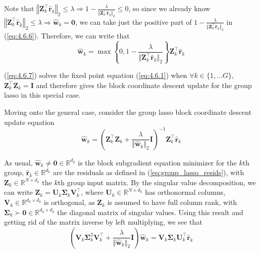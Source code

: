 \documentclass{article}
\numberwithin{equation}{section}
\begin{document}
Note that $ \left\Vert\mathbf{Z}_k^\top\hat{\mathbf{r}}_k\right\Vert_2 \le
\lambda \Rightarrow 1 - \frac{
    \lambda
}{
    \Vert\mathbf{Z}_k^\top\hat{\mathbf{r}}_k\Vert_2
}
\le 0 $, so since we already know
$ \left\Vert\mathbf{Z}_k^\top\hat{\mathbf{r}}_k\right\Vert_2 \le \lambda
\Rightarrow \hat{\mathbf{w}}_k = \mathbf{0} $, we can take just the positive
part of $ 1 - \frac{\lambda}{\Vert\mathbf{Z}_k^\top\hat{\mathbf{r}}_k\Vert_2} $
in (\ref{eq:4.6.6}). Therefore, we can write that
\begin{equation} \label{eq:4.6.7}
    \hat{\mathbf{w}}_k =
    \max\left\{
        0, 1 - \frac{\lambda}{\Vert\mathbf{Z}_k^\top\hat{\mathbf{r}}_k\Vert_2}
    \right\}
    \mathbf{Z}_k^\top\hat{\mathbf{r}}_k
\end{equation}

(\ref{eq:4.6.7}) solves the fixed point equation (\ref{eq:4.6.1}) when
$ \forall k \in \{1, \ldots G\} $,
$ \mathbf{Z}_k^\top\mathbf{Z}_k = \mathbf{I} $ and therefore gives the block
coordinate descent update for the group lasso in this special case.


Moving onto the general case, consider the group lasso block coordinate
descent update equation
\begin{equation} \label{eq:4.7.1}
    \hat{\mathbf{w}}_k =
    \left(
        \mathbf{Z}_k^\top\mathbf{Z}_k +
        \frac{\lambda}{\Vert\hat{\mathbf{w}}_k\Vert_2}\mathbf{I}
    \right)^{-1}
    \mathbf{Z}_k^\top\hat{\mathbf{r}}_k
\end{equation}

As usual, $ \hat{\mathbf{w}}_k \ne \mathbf{0} \in \mathbb{R}^{d_k} $ is the
block subgradient equation minimizer for the $ k $th group,
$ \hat{\mathbf{r}}_k \in \mathbb{R}^{d_k} $ are the residuals as defined in
(\ref{eq:group_lasso_resids}), with
$ \mathbf{Z}_k \in \mathbb{R}^{N \times d_k} $ the
$ k $th group input matrix. By the singular value decomposition, we can write
$ \mathbf{Z}_k = \mathbf{U}_k\mathbf{\Sigma}_k\mathbf{V}_k^\top $, where
$ \mathbf{U}_k \in \mathbb{R}^{N \times d_k} $ has orthonormal columns,
$ \mathbf{V}_k \in \mathbb{R}^{d_k \times d_k} $ is orthogonal, as
$ \mathbf{Z}_k $ is assumed to have full column rank, with
$ \mathbf{\Sigma}_k \succ \mathbf{0} \in \mathbb{R}^{d_k \times d_k} $ the
diagonal matrix of singular values. Using this result and getting rid of the
matrix inverse by left multiplying, we see that
\begin{equation*}
    \left(
        \mathbf{V}_k\mathbf{\Sigma}_k^2\mathbf{V}_k^\top +
        \frac{\lambda}{\Vert\hat{\mathbf{w}}_k\Vert_2}\mathbf{I}
    \right)
    \hat{\mathbf{w}}_k =
    \mathbf{V}_k\mathbf{\Sigma}_k\mathbf{U}_k^\top\hat{\mathbf{r}}_k
\end{equation*}
\end{document}
